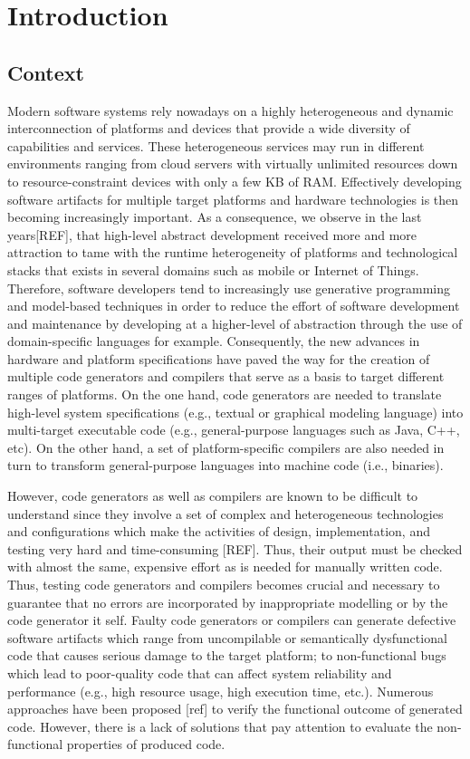 \chapter*{Introduction}
\section*{Context}
Modern software systems rely nowadays on a highly heterogeneous and dynamic interconnection of platforms and devices that provide a wide diversity of capabilities and services. These heterogeneous services may run in different environments ranging from cloud servers with virtually unlimited resources down to resource-constraint devices with only a few KB of RAM. Effectively developing software artifacts for multiple target platforms and hardware technologies is then becoming increasingly important. As a consequence, we observe in the last years[REF], that high-level abstract development received more and more attraction to tame with the runtime heterogeneity of platforms and technological stacks that exists in several domains such as mobile or Internet of Things.
Therefore, software developers tend to increasingly use generative programming and model-based techniques in order to reduce the effort of software development and maintenance by developing at a higher-level of abstraction through the use of domain-specific languages for example. 
Consequently, the new advances in hardware and platform specifications have paved the way for the creation of multiple code generators and compilers that serve as a basis to target different ranges of platforms. 
On the one hand, code generators are needed to translate high-level system specifications (e.g., textual or graphical modeling language) into multi-target executable code (e.g., general-purpose languages such as Java, C++, etc).
On the other hand, a set of platform-specific compilers are also needed in turn to transform general-purpose languages into machine code (i.e., binaries). 


However, code generators as well as compilers are known to be difficult to understand since they involve a set of complex and heterogeneous technologies and configurations which make the activities of design, implementation, and testing very hard and time-consuming [REF]. Thus, their output must be checked with almost the same, expensive effort as is needed for manually written code. 
Thus, testing code generators and compilers becomes crucial and necessary to guarantee that no errors are incorporated by inappropriate modelling or by the code generator it self. 
Faulty code generators or compilers can generate defective software artifacts which range from uncompilable or semantically dysfunctional code that causes serious damage to the target platform; to non-functional bugs which lead to poor-quality code that can affect system reliability and performance (e.g., high resource usage, high execution time, etc.). 
Numerous approaches have been proposed [ref] to verify the functional outcome of generated code. However, there is a lack of solutions that pay attention to evaluate the non-functional properties of produced code.


